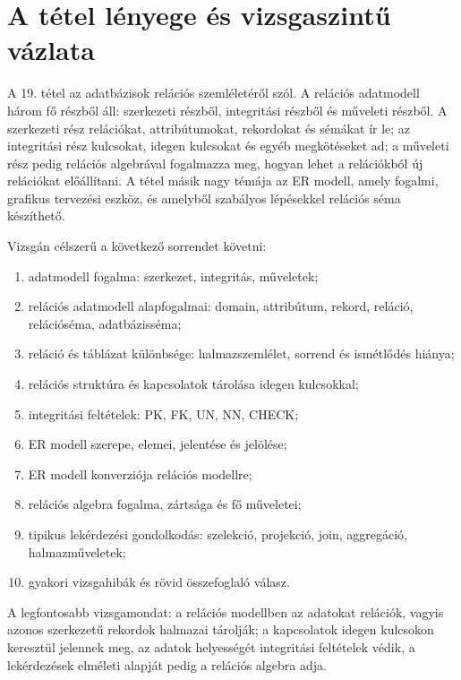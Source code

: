 \section{A tétel lényege és vizsgaszintű vázlata}

\begin{summarybox}
A 19. tétel az adatbázisok relációs szemléletéről szól. A relációs adatmodell három fő részből áll: szerkezeti részből, integritási részből és műveleti részből. A szerkezeti rész relációkat, attribútumokat, rekordokat és sémákat ír le; az integritási rész kulcsokat, idegen kulcsokat és egyéb megkötéseket ad; a műveleti rész pedig relációs algebrával fogalmazza meg, hogyan lehet a relációkból új relációkat előállítani. A tétel másik nagy témája az ER modell, amely fogalmi, grafikus tervezési eszköz, és amelyből szabályos lépésekkel relációs séma készíthető.
\end{summarybox}

Vizsgán célszerű a következő sorrendet követni:

\begin{enumerate}
  \item adatmodell fogalma: szerkezet, integritás, műveletek;
  \item relációs adatmodell alapfogalmai: domain, attribútum, rekord, reláció, relációséma, adatbázisséma;
  \item reláció és táblázat különbsége: halmazszemlélet, sorrend és ismétlődés hiánya;
  \item relációs struktúra és kapcsolatok tárolása idegen kulcsokkal;
  \item integritási feltételek: PK, FK, UN, NN, CHECK;
  \item ER modell szerepe, elemei, jelentése és jelölése;
  \item ER modell konverziója relációs modellre;
  \item relációs algebra fogalma, zártsága és fő műveletei;
  \item tipikus lekérdezési gondolkodás: szelekció, projekció, join, aggregáció, halmazműveletek;
  \item gyakori vizsgahibák és rövid összefoglaló válasz.
\end{enumerate}

A legfontosabb vizsgamondat: a relációs modellben az adatokat relációk, vagyis azonos szerkezetű rekordok halmazai tárolják; a kapcsolatok idegen kulcsokon keresztül jelennek meg, az adatok helyességét integritási feltételek védik, a lekérdezések elméleti alapját pedig a relációs algebra adja.

